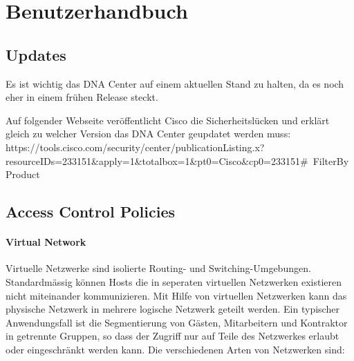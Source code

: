 \section{Benutzerhandbuch}



\subsection{Updates}
Es ist wichtig das DNA Center auf einem aktuellen Stand zu halten, da es noch eher in einem frühen Release steckt.

Auf folgender Webseite veröffentlicht Cisco die Sicherheitslücken und erklärt gleich zu welcher Version das DNA Center geupdatet werden muss:
https://tools.cisco.com/security/center/publicationListing.x?resourceIDs=233151\&apply=1\&totalbox=1\&pt0=Cisco\&cp0=233151\#~FilterByProduct


\subsection{Access Control Policies}

\paragraph{Virtual Network}
Virtuelle Netzwerke sind isolierte Routing- und Switching-Umgebungen. Standardmässig können Hosts die in seperaten virtuellen Netzwerken existieren nicht miteinander kommunizieren. Mit Hilfe von virtuellen Netzwerken kann das physische Netzwerk in mehrere logische Netzwerk geteilt werden. Ein typischer Anwendungsfall ist die Segmentierung von Gästen, Mitarbeitern und Kontraktor in getrennte Gruppen, so dass der Zugriff nur auf Teile des Netzwerkes erlaubt oder eingeschränkt werden kann. Die verschiedenen Arten von Netzwerken sind:

